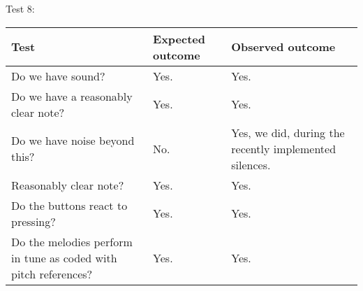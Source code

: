 Test 8:
\begin{center}
\begin{tabular}{|p{3.6cm}|p{3.6cm}|p{3.6cm}|}
\hline
{\sc Test} & {\sc Expected outcome} & {\sc Observed outcome}\\ \hline
Do we have sound? & Yes. & Yes. \\ \hline
Do we have a reasonably clear note? & Yes. & Yes. \\ \hline
Do we have noise beyond this? & No. & Yes, we did, during the recently implemented silences. \\ \hline
Reasonably clear note? & Yes. & Yes. \\ \hline
Do the buttons react to pressing? & Yes. & Yes. \\ \hline
Do the melodies perform in tune as coded with pitch references? & Yes. &
Yes. \\ \hline
\end{tabular}
\end{center}
